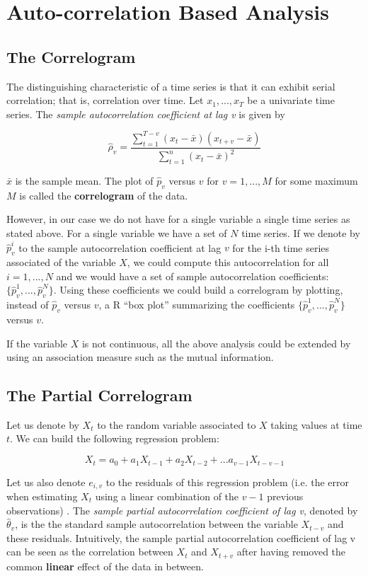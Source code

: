 \documentclass[12pt,a4paper,twopages]{article}
\begin{document}
\section{Auto-correlation Based Analysis}

\subsection{The Correlogram}
The distinguishing characteristic of a time series is that it can exhibit serial correlation; that
is, correlation over time. Let ${x_1,...,x_T}$ be a univariate time series. The \emph{sample autocorrelation coefficient at lag v} is given by 

$$ \hat{\rho}_v =\frac{\sum_{t=1}^{T-v} (x_t-\bar{x})(x_{t+v}-\bar{x})}{\sum_{t=1}^{n} (x_t-\bar{x})^2}$$ 

\noindent $\bar{x}$ is the sample mean. The plot of $\hat{p}_v$ versus $v$ for $v=1,...,M$ for some maximum $M$ is called the \textbf{correlogram} of the data.

However, in our case we do not have for a single variable a single time series as stated above. For a single variable we have a set of $N$ time series. If we denote by $\hat{p}_v^i$ to the sample autocorrelation coefficient at lag $v$ for the i-th time series associated of the variable $X$, we could compute this autocorrelation for all $i=1,...,N$ and we would have a set of sample autocorrelation coefficients: $\{\hat{p}_v^1,...,\hat{p}_v^N\}$. Using these coefficients we could build a correlogram by plotting, instead of $\hat{p}_v$ versus $v$,  a R ``box plot'' summarizing the  coefficients $\{\hat{p}_v^1,...,\hat{p}_v^N\}$ versus $v$. 

If the variable $X$ is not continuous, all the above analysis could be extended by using an association measure such as the mutual information.

\subsection{The Partial Correlogram}
Let us denote by $X_t$ to the random variable associated to $X$ taking values at time $t$. We can build the following regression problem:

$$ X_t = a_0 + a_1X_{t-1} + a_2X_{t-2} + ... a_{v-1}X_{t-v-1}$$

Let us also denote $e_{i,v}$ to the residuals of this regression problem (i.e. the error when estimating $X_t$ using a linear combination of the $v-1$ previous observations) . The \emph{sample partial autocorrelation coefficient of lag v}, denoted by  $\hat{\theta}_v$, is the the standard sample autocorrelation between  the variable $X_{t-v}$ and these residuals. Intuitively, the sample partial autocorrelation coefficient of lag v can be seen as the correlation between $X_t$ and $X_{t+v}$ after having removed the common \textbf{linear} effect of the data in between.
\end{document}
